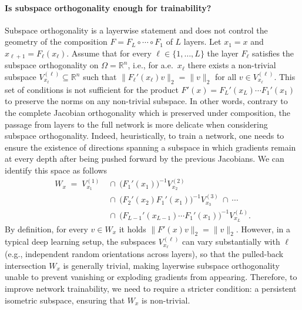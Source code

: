 \documentclass{article}
\theoremstyle{plain}
\theoremstyle{definition}
\theoremstyle{definition}
\theoremstyle{remark}
\theoremstyle{definition}
\theoremstyle{definition}
\theoremstyle{remark}
\numberwithin{equation}{section}
\begin{document}
\paragraph{Is subspace orthogonality enough for trainability?}
Subspace orthogonality is a layerwise statement and does not control the geometry of the composition $F = F_L\circ\cdots\circ F_1$ of $L$ layers. 
Let $x_1=x$ and $x_{\ell+1}=F_\ell(x_\ell)$. Assume that for every $\ell\in\{1,\dots,L\}$ the layer $F_\ell$ satisfies the subspace orthogonality on $\Omega=\mathbb{R}^n$, i.e., for a.e.\, $x_\ell$ there exists a non-trivial subspace $V^{(\ell)}_{x_\ell}\subseteq \mathbb{R}^n$ such that $\|F_\ell'(x_\ell)v\|_2=\|v\|_2$ for all $v\in V^{(\ell)}_{x_\ell}$. This set of conditions is not sufficient for the product $F'(x)=F_L'(x_L)\cdots F_1'(x_1)$ to preserve the norms on any non-trivial subspace. In other words, contrary to the complete Jacobian orthogonality which is preserved under composition, the passage from layers to the full network is more delicate when considering subspace orthogonality. Indeed, heuristically, to train a network, one needs to ensure the existence of directions spanning a  subspace in which gradients remain at every depth after being pushed forward by the previous Jacobians. We can identify this space as follows
\begin{equation}\label{eq:Wx}
\begin{split}
W_x \;=\; V^{(1)}_{x_1}&\ \cap\ \big(F_1'(x_1)\big)^{-1}V^{(2)}_{x_2}\\
&\ \cap\ \big(F_2'(x_2)F_1'(x_1)\big)^{-1}V^{(3)}_{x_3}\ \cap\ \cdots\ \\
&\ \cap\ \big(F_{L-1}'(x_{L-1})\cdots F_1'(x_1)\big)^{-1}V^{(L)}_{x_L}.
\end{split}
\end{equation}
By definition, for every $v \in W_x$ it holds $\|F'(x)v\|_2=\|v\|_2$. However, in a typical deep learning setup, the subspaces $V^{(\ell)}_{x_\ell}$ can vary substantially with $\ell$ (e.g., independent random orientations across layers), so that the pulled-back intersection $W_x$ is generally trivial, making layerwise subspace orthogonality unable to prevent vanishing or exploding gradients from appearing. Therefore, to improve network trainability, we need to require a stricter condition: a persistent isometric subspace, ensuring that $W_x$ is non-trivial.
\end{document}
